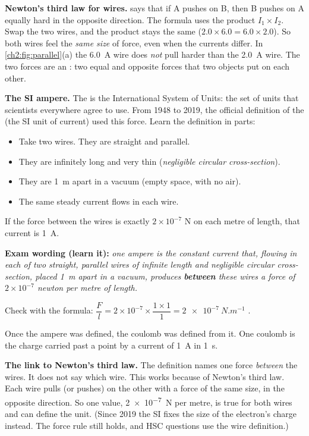 \textbf{Newton's third law for wires.}  says that if A pushes on B, then B
pushes on A equally hard in the opposite direction. The formula uses the product
$I_1 \times I_2$. Swap the two wires, and the product stays the same ($2.0 \times 6.0 =
6.0 \times 2.0$). So both wires feel the \emph{same size} of force, even when the currents
differ. In
\cref{ch2:fig:parallel}(a) the \qty{6.0}{A} wire does \emph{not} pull harder than the \qty{2.0}{A}
wire. The two forces are an : two equal and opposite forces that two
objects put on each other.

\textbf{The SI ampere.} The  is the International System of Units: the set of units that
scientists everywhere agree to use. From 1948 to 2019, the official definition of the
 (the SI unit of current) used this force. Learn the definition in parts:
\begin{itemize}
  \item Take two wires. They are straight and parallel.
  \item They are infinitely long and very thin (\emph{negligible circular cross-section}).
  \item They are \qty{1}{m} apart in a vacuum (empty space, with no air).
  \item The same steady current flows in each wire.
\end{itemize}
If the force between the wires is exactly $2 \times 10^{-7}$ N on each metre of length, that
current is \qty{1}{A}.

\textbf{Exam wording (learn it):} \emph{one ampere is the constant current that, flowing in each
of two straight, parallel wires of infinite length and negligible circular cross-section, placed
\qty{1}{m} apart in a vacuum, produces \textbf{between} these wires a force of
$2 \times 10^{-7}$ newton per metre of length.}

Check with the formula: $\dfrac{F}{l} = 2 \times 10^{-7} \times \dfrac{1 \times 1}{1} =
\qty{2e-7}{N.m^{-1}}$ \cmark.

Once the ampere was defined, the coulomb was defined from it. One coulomb is the charge carried
past a point by a current of \qty{1}{A} in \qty{1}{s}.

\textbf{The link to Newton's third law.} The definition names one force \emph{between} the wires.
It does not say which wire. This works because of Newton's third law. Each wire pulls (or pushes)
on the other with a force of the same size, in the opposite direction. So one value,
\qty{2e-7}{N} per metre, is true for both wires and can define the unit. (Since 2019 the SI fixes the size of the
electron's charge instead. The force rule still holds, and HSC questions use the wire definition.)

